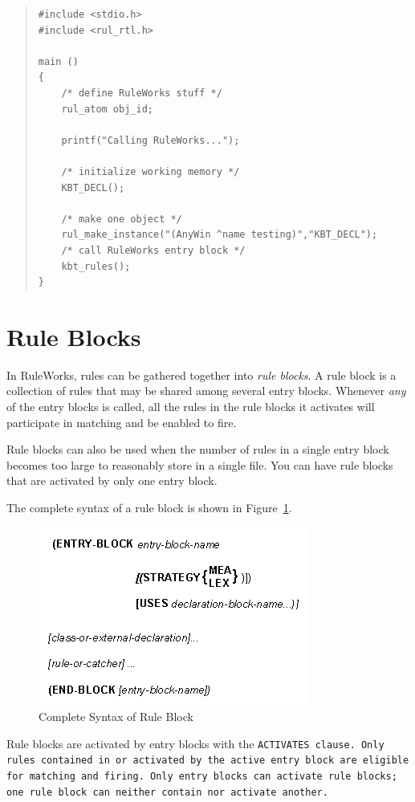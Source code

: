 \begin{quote}
\begin{verbatim}
#include <stdio.h>
#include <rul_rtl.h>

main ()
{
    /* define RuleWorks stuff */
    rul_atom obj_id;

    printf("Calling RuleWorks...");

    /* initialize working memory */
    KBT_DECL();

    /* make one object */
    rul_make_instance("(AnyWin ^name testing)","KBT_DECL");
    /* call RuleWorks entry block */
    kbt_rules();
}
\end{verbatim}
\end{quote}

\section{Rule Blocks}

In RuleWorks, rules can be gathered together into \emph{rule
  blocks}. A rule block is a collection of rules that may be shared
among several entry blocks. Whenever \emph{any} of the entry blocks is
called, all the rules in the rule blocks it activates will participate
in matching and be enabled to fire.

Rule blocks can also be used when the number of rules in a single
entry block becomes too large to reasonably store in a single file.
You can have rule blocks that are activated by only one entry block.

The complete syntax of a rule block is shown in Figure~\ref{f:5-7}.

\begin{figure}[h]
  \centering
  \includegraphics[scale=0.7]{f5-7}
  \caption{Complete Syntax of Rule Block}
  \label{f:5-7}
\end{figure}

Rule blocks are activated by entry blocks with the \tt{ACTIVATES}
clause. Only rules contained in or activated by the active entry block
are eligible for matching and firing. Only entry blocks can activate
rule blocks; one rule block can neither contain nor activate another.

